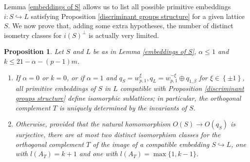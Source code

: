 \documentclass{amsart}
\newtheorem{prop}[theorem]{Proposition}
\theoremstyle{definition}
\newcommand{\ra}{\rightarrow}
\begin{document}
Lemma \ref{embeddings of S} allows us to list all possible primitive embeddings $i: S \hookrightarrow L$ satisfying Proposition \ref{discriminant groups structure} for a given lattice $S$. We now prove that, adding some extra hypotheses, the number of distinct isometry classes for $i(S)^\perp$ is actually very limited.

\begin{prop}\label{unicity embedding and Tbis}
Let $S$ and $L$ be as in Lemma \ref{embeddings of S}, $\alpha \leq 1$ and $k \leq 21 - \alpha - (p-1)m$.
\begin{enumerate}
\item[\textit{(i)}] If $\alpha = 0$ or $k=0$, or if $\alpha = 1$ and $q_S =w^{\xi}_{p,1}, q_L=w^{-\xi}_{p,1} \oplus q_{1, \beta}$ for $\xi \in \left\{ \pm 1\right\}$, all primitive embeddings of $S$ in $L$ compatible with Proposition \ref{discriminant groups structure} define isomorphic sublattices; in particular, the orthogonal complement $T$ is uniquely determined by the invariants of $S$. 
\item[\textit{(ii)}] Otherwise, provided that the natural homomorphism $O(S) \ra O(q_S)$ is surjective, there are at most two distinct isomorphism classes for the orthogonal complement $T$ of the image of a compatible embedding $S \hookrightarrow L$, one with $l(A_T)=k+1$ and one with $l(A_T) = \max\{1,k-1\}$.
\end{enumerate}
\end{prop}
\end{document}
